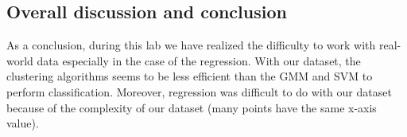 \subsection{Overall discussion and conclusion}


As a conclusion, during this lab we have realized the difficulty to work with real-world data especially in the case of the regression. With our dataset, the clustering algorithms seems to be less efficient than the GMM and SVM to perform classification. Moreover, regression was difficult to do with our dataset because of the complexity of our dataset (many points have the same x-axis value).
